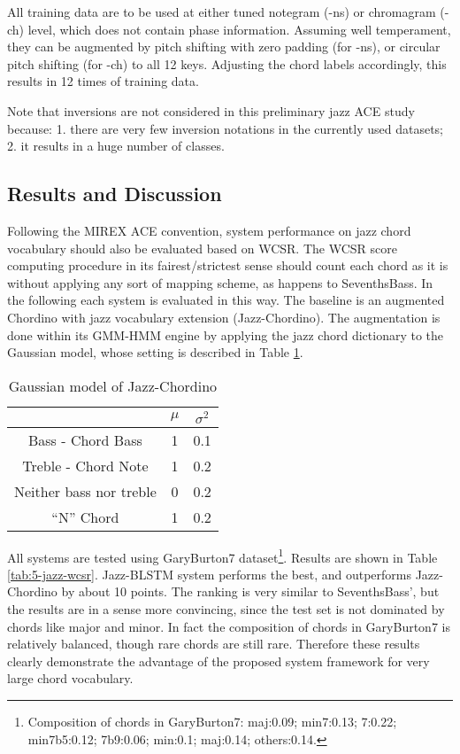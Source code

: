 All training data are to be used at either tuned notegram (-ns) or chromagram (-ch) level, which does not contain phase information. Assuming well temperament, they can be augmented by pitch shifting with zero padding (for -ns), or circular pitch shifting (for -ch) to all 12 keys. Adjusting the chord labels accordingly, this results in 12 times of training data.

Note that inversions are not considered in this preliminary jazz ACE study because: 1. there are very few inversion notations in the currently used datasets; 2. it results in a huge number of classes.

\subsection{Results and Discussion}
Following the MIREX ACE convention, system performance on jazz chord vocabulary should also be evaluated based on WCSR. The WCSR score computing procedure in its fairest/strictest sense should count each chord as it is without applying any sort of mapping scheme, as happens to SeventhsBass. In the following each system is evaluated in this way. The baseline is an augmented Chordino with jazz vocabulary extension (Jazz-Chordino). The augmentation is done within its GMM-HMM engine by applying the jazz chord dictionary to the Gaussian model, whose setting is described in Table \ref{tab:5-jcgau}.

\begin{table}
\centering
\footnotesize
\begin{tabular}{|c|c|c|} \hline
      & $\mu$ & $\sigma^2$ \\ \hline
Bass - Chord Bass & 1 & 0.1 \\ \hline
Treble - Chord Note & 1 & 0.2  \\ \hline
Neither bass nor treble & 0 & 0.2 \\ \hline
 ``N'' Chord  & 1 & 0.2  \\ \hline
\end{tabular}
\caption{Gaussian model of Jazz-Chordino}
\label{tab:5-jcgau}
\end{table}

All systems are tested using GaryBurton7 dataset\footnote{Composition of chords in GaryBurton7: maj:0.09; min7:0.13; 7:0.22; min7b5:0.12; 7b9:0.06; min:0.1; maj:0.14; others:0.14.}. Results are shown in Table \ref{tab:5-jazz-wcsr}. Jazz-BLSTM system performs the best, and outperforms Jazz-Chordino by about 10 points. The ranking is very similar to SeventhsBass', but the results are in a sense more convincing, since the test set is not dominated by chords like major and minor. In fact the composition of chords in GaryBurton7 is relatively balanced, though rare chords are still rare. Therefore these results clearly demonstrate the advantage of the proposed system framework for very large chord vocabulary.

